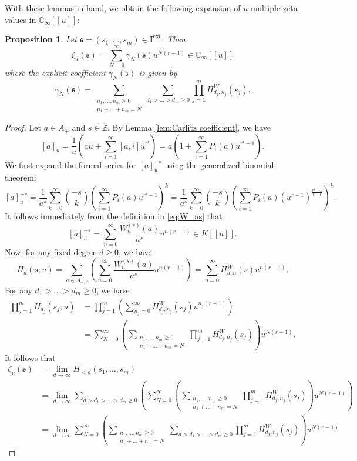 \documentclass[12pt,reqno]{amsart}
\numberwithin{equation}{section}
\theoremstyle{plain}
\newtheorem{prop}[thm]{Proposition}
\theoremstyle{definition}
\theoremstyle{remark}
\newcommand{\ZZ}{\mathbb{Z}}
\newcommand{\CC}{\mathbb{C}}
\newcommand{\mbb}[1]{[\![{#1}]\!]}
\newcommand{\ww}[1]{\mathfrak{#1}}
\newcommand{\Ical}{\mathbf{I}}
\newcommand{\ext}{\mathrm{ext}}
\begin{document}
With these lemmas in hand, we obtain the following expansion of $u$-multiple zeta values in $\CC_\infty\mbb{u}$:
\begin{prop}\label{prop:expansion of umzv}
Let $\ww{s}=(s_1,\ldots,s_m)\in\Ical^{\ext}$. Then $$\zeta_u(\ww{s}) = \sum_{N=0}^{\infty} \gamma_N(\ww{s}) u^{N(r-1)}\in\CC_\infty\mbb{u}$$where the explicit coefficient $\gamma_N(\ww{s})$ is given by \begin{equation}\label{eq:gammaN}
    \gamma_N(\ww{s}) =  \sum_{\substack{n_1, \dots, n_m \ge 0 \\ n_1 + \dots + n_m = N}} \sum_{d_1 > \dots > d_m \ge 0} \prod_{j=1}^m H^W_{d_j,n_j}(s_j) .
\end{equation}
\end{prop}
\begin{proof}Let $a\in A_+$ and $s\in\ZZ$. By Lemma \ref{lem:Carlitz coefficient}, we have
$$[a]_u = \frac{1}{u} \left( au + \sum_{i=1}^{\infty} [a,i] u^{r^i} \right) = a \left( 1 + \sum_{i=1}^{\infty} P_i(a) u^{r^i-1} \right).$$
We first expand the formal series for $[a]_u^{-s}$ using the generalized binomial theorem:
$$[a]_u^{-s} = \frac{1}{a^s} \sum_{k=0}^{\infty} \binom{-s}{k} \left( \sum_{i=1}^{\infty} P_i(a) u^{r^i-1} \right)^k = \frac{1}{a^s} \sum_{k=0}^{\infty} \binom{-s}{k} \left( \sum_{i=1}^{\infty} P_i(a) (u^{r-1})^{\frac{r^i-1}{r-1}} \right)^k.$$
It follows immediately from the definition in \eqref{eq:W_ns} that 
\begin{equation}\label{eq:local_exp}[a]_u^{-s} = \sum_{n=0}^{\infty} \frac{W_n^{(s)}(a)}{a^s} u^{n(r-1)} \in K\mbb{u}.\end{equation}
Now, for any fixed degree $d \ge 0$, we have
$$H_d(s;u) = \sum_{a \in A_{+,d}} \left( \sum_{n=0}^{\infty} \frac{W_n^{(s)}(a)}{a^s} u^{n(r-1)} \right)= \sum_{n=0}^{\infty} H^W_{d,n}(s)  u^{n(r-1)}.$$
For any $d_1 > \dots > d_m \ge 0$, we have
\begin{align*}\prod_{j=1}^m H_{d_j}(s_j;u) &= \prod_{j=1}^m \left( \sum_{n_j=0}^{\infty} H^W_{d_j,n_j}(s_j) u^{n_j(r-1)} \right) \\&= \sum_{N=0}^{\infty} \left( \sum_{\substack{n_1, \dots, n_m \ge 0 \\ n_1+\dots+n_m=N}} \prod_{j=1}^m H^W_{d_j,n_j}(s_j) \right) u^{N(r-1)}.
\end{align*}
It follows that 
\begin{align*}
    \zeta_u(\ww{s}) &=\lim_{d\to\infty} H_{<d}(s_1,\ldots,s_m)\\ &=\lim_{d\to\infty}\sum_{d>d_1 > \dots > d_m \ge 0} \left( \sum_{N=0}^{\infty} \left( \sum_{\substack{n_1, \dots, n_m \ge 0 \\ n_1+\dots+n_m=N}} \prod_{j=1}^m H^W_{d_j,n_j}(s_j) \right) u^{N(r-1)} \right)\\
    &=\lim_{d\to\infty}\sum_{N=0}^{\infty} \left( \sum_{\substack{n_1, \dots, n_m \ge 0 \\ n_1 + \dots + n_m = N}} \sum_{d>d_1 > \dots > d_m \ge 0} \prod_{j=1}^m H^W_{d_j,n_j}(s_j) \right) u^{N(r-1)}
\end{align*}


\end{proof}
\end{document}
